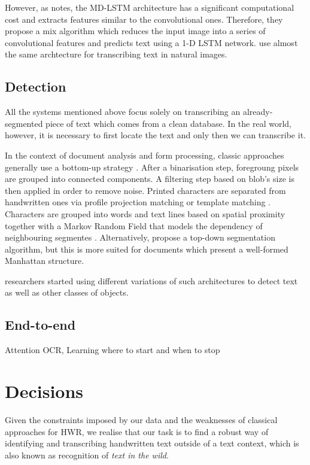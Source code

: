 		However, as \citet{MDLSTM_vs_CNN} notes, the MD-LSTM architecture has a significant computational cost and extracts features similar to the convolutional ones. Therefore, they propose a mix algorithm which reduces the input image into a series of convolutional features and predicts text using a 1-D LSTM network.  use almost the same archtecture for transcribing text in natural images.


	\subsection{Detection}

		All the systems mentioned above focus solely on transcribing an already-segmented piece of text which comes from a clean database. In the real world, however, it is necessary to first locate the text and only then we can transcribe it.


		In the context of document analysis and form processing, classic approaches generally use a bottom-up strategy \citep{bottom_up}. After a binarisation step, foregroung pixels are grouped into connected components. A filtering step based on blob's size is then applied in order to remove noise. Printed characters are separated from handwritten ones via profile projection matching \citep{profile_matching,moysset2014a2ia} or template matching \citep{template_matching}. Characters are grouped into words and text lines based on spatial proximity together with a Markov Random Field that models the dependency of neighbouring segmentes \citep{detection_mrf,detection_mrf2}. Alternatively, \citet{top_down} propose a top-down segmentation algorithm, but this is more suited for documents which present a well-formed Manhattan structure.


		researchers started using different variations of such architectures to detect text as well as other classes of objects.


	\subsection{End-to-end}
	Attention OCR, Learning where to start and when to stop






\section{Decisions}

	Given the constraints imposed by our data and the weaknesses of classical approaches for HWR, we realise that our task is to find a robust way of identifying and transcribing handwritten text outside of a text context, which is also known as recognition of \emph{text in the wild}.





